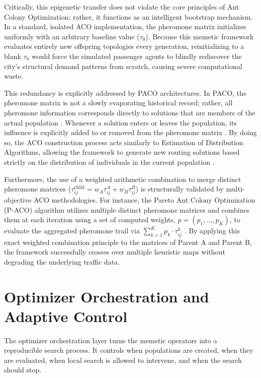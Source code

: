 {{Critically, this epigenetic transfer does not violate the core principles of Ant Colony Optimization; rather, it functions as an intelligent bootstrap mechanism. In a standard, isolated ACO implementation, the pheromone matrix initializes uniformly with an arbitrary baseline value ($\tau_0$). Because this memetic framework evaluates entirely new offspring topologies every generation, reinitializing to a blank $\tau_0$ would force the simulated passenger agents to blindly rediscover the city's structural demand patterns from scratch, causing severe computational waste.

This redundancy is explicitly addressed by \ac{PACO} architectures. In \ac{PACO}, the pheromone matrix is not a slowly evaporating historical record; rather, all pheromone information corresponds directly to solutions that are members of the actual population \citep{guntsch2002population}. Whenever a solution enters or leaves the population, its influence is explicitly added to or removed from the pheromone matrix \citep{garcia2007taxonomy, guntsch2002population}. By doing so, the ACO construction process acts similarly to Estimation of Distribution Algorithms, allowing the framework to generate new routing solutions based strictly on the distribution of individuals in the current population \citep{garcia2007taxonomy}.

Furthermore, the use of a weighted arithmetic combination to merge distinct pheromone matrices ($\tau^{\text{child}}_{ij} = w_A \tau^A_{ij} + w_B \tau^B_{ij}$) is structurally validated by multi-objective ACO methodologies. For instance, the Pareto Ant Colony Optimization (P-ACO) algorithm utilizes multiple distinct pheromone matrices and combines them at each iteration using a set of computed weights, $p = (p_1, \dots, p_K)$, to evaluate the aggregated pheromone trail via $\sum_{k=1}^K p_k \cdot \tau_{ij}^k$ \citep{garcia2007taxonomy}. By applying this exact weighted combination principle to the matrices of Parent A and Parent B, the framework successfully crosses over multiple heuristic maps without degrading the underlying traffic data.
\section{Optimizer Orchestration and Adaptive Control}
\noindent
The optimizer orchestration layer turns the memetic operators into a reproducible search process. It controls when populations are created, when they are evaluated, when local search is allowed to intervene, and when the search should stop.

}}
